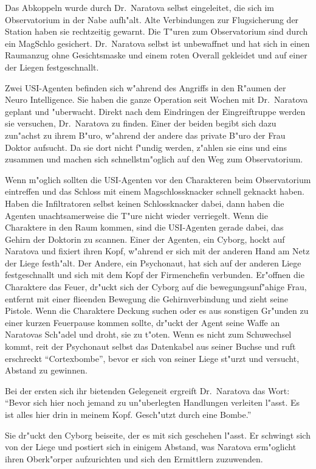 Das Abkoppeln wurde durch Dr.~Naratova selbst eingeleitet, die sich im Observatorium in der Nabe aufh"alt. Alte Verbindungen zur Flugsicherung der Station haben sie rechtzeitig gewarnt. Die T"uren zum Observatorium sind durch ein MagSchlo\3 gesichert. Dr.~Naratova selbst ist unbewaffnet und hat sich in einen Raumanzug ohne Gesichtsmaske und einem roten Overall gekleidet und auf einer der Liegen festgeschnallt.

Zwei USI-Agenten befinden sich w"ahrend des Angriffs in den R"aumen der Neuro Intelligence. Sie haben die ganze Operation seit Wochen mit Dr.~Naratova geplant und "uberwacht. Direkt nach dem Eindringen der Eingreiftruppe werden sie versuchen, Dr.~Naratova zu finden. Einer der beiden begibt sich dazu zun"achst zu ihrem B"uro, w"ahrend der andere das private B"uro der Frau Doktor aufsucht. Da sie dort nicht f"undig werden, z"ahlen sie eins und eins zusammen und machen  sich schnellstm"oglich auf den Weg zum Observatorium.

Wenn m"oglich sollten die USI-Agenten vor den Charakteren beim Observatorium eintreffen und das Schloss mit einem Magschlossknacker schnell geknackt haben. Haben die Infiltratoren selbst keinen Schlossknacker dabei, dann haben die Agenten unachtsamerweise die T"ure nicht wieder verriegelt. Wenn die Charaktere in den Raum kommen, sind die USI-Agenten gerade dabei, das Gehirn der Doktorin zu scannen. Einer der Agenten, ein Cyborg, hockt auf Naratova und fixiert ihren Kopf, w"ahrend er sich mit der anderen Hand am Netz der Liege festh"alt. Der Andere, ein Psychonaut, hat sich auf der anderen Liege festgeschnallt und sich mit dem Kopf der Firmenchefin verbunden. Er"offnen die Charaktere das Feuer, dr"uckt sich der Cyborg auf die bewegungsunf"ahige Frau, entfernt mit einer flie\3enden Bewegung die Gehirnverbindung und zieht seine Pistole. Wenn die Charaktere Deckung suchen oder es aus sonstigen Gr"unden zu einer kurzen Feuerpause kommen sollte, dr"uckt der Agent seine Waffe an Naratovas Sch"adel und droht, sie zu t"oten. Wenn es nicht zum Schu\3wechsel kommt, rei\3t der Psychonaut selbst das Datenkabel aus seiner Buchse und ruft erschreckt "`Cortexbombe"', bevor er sich von seiner Liege st"urzt und versucht, Abstand zu gewinnen.

Bei der ersten sich ihr bietenden Gelegeneit ergreift Dr.~Naratova das Wort: "`Bevor sich hier noch jemand zu un"uberlegten Handlungen verleiten l"asst. Es ist alles hier drin in meinem Kopf. Gesch"utzt durch eine Bombe."'

Sie dr"uckt den Cyborg beiseite, der es mit sich geschehen l"asst. Er schwingt sich von der Liege und postiert sich in einigem Abstand, was Naratova erm"oglicht ihren Oberk"orper aufzurichten und sich den Ermittlern zuzuwenden.

